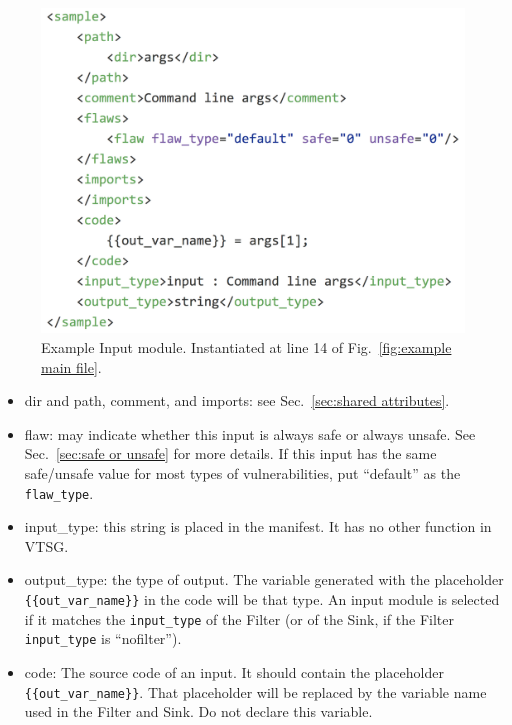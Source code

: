 \documentclass[12pt]{article}
\begin{document}
\begin{figure}[htb]
  \includegraphics{fig_Input_file.png}
  \caption{Example Input module.  Instantiated at line 14 of 
  Fig.~\ref{fig:example main file}.}
  \label{fig:example input file}
\end{figure}

\begin{itemize}
    \item dir and path, comment, and imports: see Sec.~\ref{sec:shared attributes}.

    \item flaw: may indicate whether this input is always safe or always unsafe.
      See Sec.~\ref{sec:safe or unsafe} for
      more details.  If this input has the same safe/unsafe value for most
      types of vulnerabilities, put ``default'' as the \verb|flaw_type|.

    \item input\_type: this string is placed in the manifest.  It has no other
      function in VTSG.

    \item output\_type: the type of output.  The variable generated with the
      placeholder \\ \verb|{{out_var_name}}| in the code will be that type.
      An input module is selected if it matches the \verb|input_type| of the Filter
      (or of the Sink, if the Filter \verb|input_type| is ``nofilter'').

    \item code: The source code of an input. It should contain the placeholder \\
      \verb|{{out_var_name}}|.  That placeholder will be replaced by the variable
      name used in the Filter and Sink.  Do not declare this variable.
\end{itemize}
\end{document}
